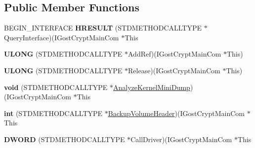 \subsection*{Public Member Functions}
\begin{DoxyCompactItemize}
\item 
\mbox{\label{struct_i_gost_crypt_main_com_vtbl_ab6197a0438deafc15457e95389d86309}} 
B\+E\+G\+I\+N\+\_\+\+I\+N\+T\+E\+R\+F\+A\+CE {\bfseries H\+R\+E\+S\+U\+LT} (S\+T\+D\+M\+E\+T\+H\+O\+D\+C\+A\+L\+L\+T\+Y\+PE $\ast$Query\+Interface)(I\+Gost\+Crypt\+Main\+Com $\ast$This
\item 
\mbox{\label{struct_i_gost_crypt_main_com_vtbl_a22ee1ea9f35a79bc7f45ff92aad709ca}} 
{\bfseries U\+L\+O\+NG} (S\+T\+D\+M\+E\+T\+H\+O\+D\+C\+A\+L\+L\+T\+Y\+PE $\ast$Add\+Ref)(I\+Gost\+Crypt\+Main\+Com $\ast$This)
\item 
\mbox{\label{struct_i_gost_crypt_main_com_vtbl_a4cb599710039749dee535e6b777ea8a4}} 
{\bfseries U\+L\+O\+NG} (S\+T\+D\+M\+E\+T\+H\+O\+D\+C\+A\+L\+L\+T\+Y\+PE $\ast$Release)(I\+Gost\+Crypt\+Main\+Com $\ast$This)
\item 
\mbox{\label{struct_i_gost_crypt_main_com_vtbl_a09c4dc16c08fdbc5c02a0b8df79b523a}} 
{\bfseries void} (S\+T\+D\+M\+E\+T\+H\+O\+D\+C\+A\+L\+L\+T\+Y\+PE $\ast$\hyperlink{_mount_8c_a7bfdb38641976f9d9a484b63d5845f86}{Analyze\+Kernel\+Mini\+Dump})(I\+Gost\+Crypt\+Main\+Com $\ast$This
\item 
\mbox{\label{struct_i_gost_crypt_main_com_vtbl_a5fcbc7b0c6d36743d16549eac42794a1}} 
{\bfseries int} (S\+T\+D\+M\+E\+T\+H\+O\+D\+C\+A\+L\+L\+T\+Y\+PE $\ast$\hyperlink{_mount_8c_a80e2191b50f9e6ba9b4b26db9c2f36b7}{Backup\+Volume\+Header})(I\+Gost\+Crypt\+Main\+Com $\ast$This
\item 
\mbox{\label{struct_i_gost_crypt_main_com_vtbl_ae74caf585ae9bdacc2d72936da776428}} 
{\bfseries D\+W\+O\+RD} (S\+T\+D\+M\+E\+T\+H\+O\+D\+C\+A\+L\+L\+T\+Y\+PE $\ast$Call\+Driver)(I\+Gost\+Crypt\+Main\+Com $\ast$This
\item 
\mbox{\label{struct_i_gost_crypt_main_com_vtbl_a7c83b02871abea1ceb50d58384d199d8}} 

\end{DoxyCompactItemize}
